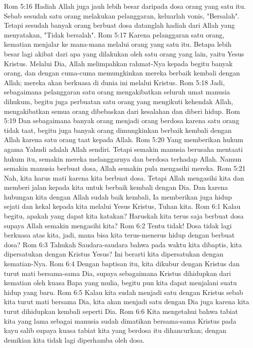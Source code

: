 Rom 5:16  Hadiah Allah juga jauh lebih besar daripada dosa orang yang satu itu. Sebab sesudah satu orang melakukan pelanggaran, keluarlah vonis, "Bersalah". Tetapi sesudah banyak orang berbuat dosa datanglah hadiah dari Allah yang menyatakan, "Tidak bersalah".
Rom 5:17  Karena pelanggaran satu orang, kematian menjalar ke mana-mana melalui orang yang satu itu. Betapa lebih besar lagi akibat dari apa yang dilakukan oleh satu orang yang lain, yaitu Yesus Kristus. Melalui Dia, Allah melimpahkan rahmat-Nya kepada begitu banyak orang, dan dengan cuma-cuma memungkinkan mereka berbaik kembali dengan Allah; mereka akan berkuasa di dunia ini melalui Kristus.
Rom 5:18  Jadi, sebagaimana pelanggaran satu orang mengakibatkan seluruh umat manusia dihukum, begitu juga perbuatan satu orang yang mengikuti kehendak Allah, mengakibatkan semua orang dibebaskan dari kesalahan dan diberi hidup.
Rom 5:19  Dan sebagaimana banyak orang menjadi orang berdosa karena satu orang tidak taat, begitu juga banyak orang dimungkinkan berbaik kembali dengan Allah karena satu orang taat kepada Allah.
Rom 5:20  Yang memberikan hukum agama Yahudi adalah Allah sendiri. Tetapi semakin manusia berusaha mentaati hukum itu, semakin mereka melanggarnya dan berdosa terhadap Allah. Namun semakin manusia berbuat dosa, Allah semakin pula mengasihi mereka.
Rom 5:21  Nah, kita harus mati karena kita berbuat dosa. Tetapi Allah mengasihi kita dan memberi jalan kepada kita untuk berbaik kembali dengan Dia. Dan karena hubungan kita dengan Allah sudah baik kembali, Ia memberikan juga hidup sejati dan kekal kepada kita melalui Yesus Kristus, Tuhan kita.
Rom 6:1  Kalau begitu, apakah yang dapat kita katakan? Haruskah kita terus saja berbuat dosa supaya Allah semakin mengasihi kita?
Rom 6:2  Tentu tidak! Dosa tidak lagi berkuasa atas kita, jadi, mana bisa kita terus-menerus hidup dengan berbuat dosa?
Rom 6:3  Tahukah Saudara-saudara bahwa pada waktu kita dibaptis, kita dipersatukan dengan Kristus Yesus? Ini berarti kita dipersatukan dengan kematian-Nya.
Rom 6:4  Dengan baptisan itu, kita dikubur dengan Kristus dan turut mati bersama-sama Dia, supaya sebagaimana Kristus dihidupkan dari kematian oleh kuasa Bapa yang mulia, begitu pun kita dapat menjalani suatu hidup yang baru.
Rom 6:5  Kalau kita sudah menjadi satu dengan Kristus sebab kita turut mati bersama Dia, kita akan menjadi satu dengan Dia juga karena kita turut dihidupkan kembali seperti Dia.
Rom 6:6  Kita mengetahui bahwa tabiat kita yang lama sebagai manusia sudah dimatikan bersama-sama Kristus pada kayu salib supaya kuasa tabiat kita yang berdosa itu dihancurkan; dengan demikian kita tidak lagi diperhamba oleh dosa.
